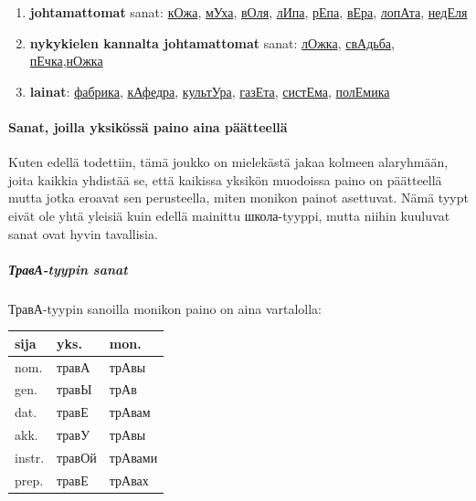\documentclass[]{scrartcl}
\providecommand{\tightlist}{%
  \setlength{\itemsep}{0pt}\setlength{\parskip}{0pt}}
\begin{document}
\begin{enumerate}
\def\labelenumi{\arabic{enumi}.}
\tightlist
\item
  \textbf{johtamattomat} sanat:
  \href{http://ru.wiktionary.org/wiki/кожа}{кОжа},
  \href{http://ru.wiktionary.org/wiki/муха}{мУха},
  \href{http://ru.wiktionary.org/wiki/воля}{вОля},
  \href{http://ru.wiktionary.org/wiki/липа}{лИпа},
  \href{http://ru.wiktionary.org/wiki/репа}{рЕпа},
  \href{http://ru.wiktionary.org/wiki/вера}{вЕра},
  \href{http://ru.wiktionary.org/wiki/лопата}{лопАта},
  \href{http://ru.wiktionary.org/wiki/неделя}{недЕля}
\item
  \textbf{nykykielen kannalta johtamattomat} sanat:
  \href{http://ru.wiktionary.org/wiki/ложка}{лОжка},
  \href{http://ru.wiktionary.org/wiki/свадьба}{свАдьба},
  \href{http://ru.wiktionary.org/wiki/печка}{пЕчка},\href{http://ru.wiktionary.org/wiki/ножка}{нОжка}
\item
  \textbf{lainat}:
  \href{http://ru.wiktionary.org/wiki/фабрика}{фабрика},
  \href{http://ru.wiktionary.org/wiki/кафедра}{кАфедра},
  \href{http://ru.wiktionary.org/wiki/культура}{культУра},
  \href{http://ru.wiktionary.org/wiki/газета}{газЕта},
  \href{http://ru.wiktionary.org/wiki/система}{систЕма},
  \href{http://ru.wiktionary.org/wiki/полемика}{полЕмика}
\end{enumerate}

\paragraph{Sanat, joilla yksikössä paino aina
päätteellä}\label{sanat-joilla-yksikuxf6ssuxe4-paino-aina-puxe4uxe4tteelluxe4}

Kuten edellä todettiin, tämä joukko on mielekästä jakaa kolmeen
alaryhmään, joita kaikkia yhdistää se, että kaikissa yksikön muodoissa
paino on päätteellä mutta jotka eroavat sen perusteella, miten monikon
painot asettuvat. Nämä tyypt eivät ole yhtä yleisiä kuin edellä mainittu
школа-tyyppi, mutta niihin kuuluvat sanat ovat hyvin tavallisia.

\subparagraph{ТравА-tyypin
sanat}\label{ux442ux440ux430ux432ux430-tyypin-sanat}

ТравА-tyypin sanoilla monikon paino on aina vartalolla:

\begin{longtable}[c]{@{}lll@{}}
\toprule
sija & yks. & mon.\tabularnewline
\midrule
\endhead
nom. & травА & трАвы\tabularnewline
gen. & травЫ & трАв\tabularnewline
dat. & травЕ & трАвам\tabularnewline
akk. & травУ & трАвы\tabularnewline
instr. & травОй & трАвами\tabularnewline
prep. & травЕ & трАвах\tabularnewline
\bottomrule
\end{longtable}
\end{document}
